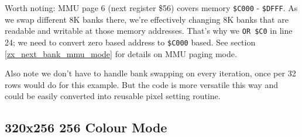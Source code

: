 \documentclass[12pt,twoside,openright,a4paper]{book}
\begin{document}
Worth noting: MMU page 6 (next register \$56) covers memory {\tt \$C000} - {\tt \$DFFF}. As we swap different 8K banks there, we're effectively changing 8K banks that are readable and writable at those memory addresses. That's why we {\tt OR \$C0} in line 24; we need to convert zero based address to {\tt \$C000} based. See section \ref{zx_next_bank_mmu_mode} for details on MMU paging mode.

Also note we don't have to handle bank swapping on every iteration, once per 32 rows would do for this example. But the code is more versatile this way and could be easily converted into reusable pixel setting routine.


\pagebreak
\subsection{320x256 256 Colour Mode}
\end{document}
